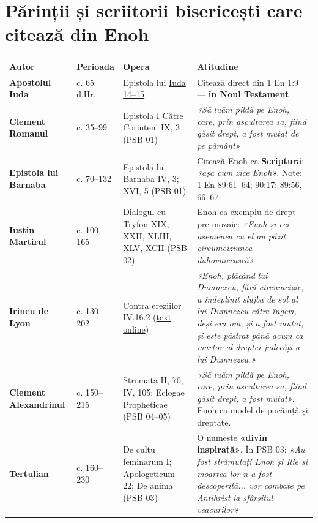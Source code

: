 \documentclass[12pt,a4paper,twoside,openany]{book}
\begin{document}
\chapter{Părinții și scriitorii bisericești care citează din Enoh}\label{parinti}
\small
\begin{longtable}{L{0.8cm}L{0.8cm}L{3.1cm}L{10.0cm}}
\toprule
{}
\textbf{Autor} & \textbf{Perioada} & \textbf{Opera} & \textbf{Atitudine} \\
\midrule
\endhead
{}
\textbf{Apostolul Iuda} & c. 65 d.Hr. & Epistola lui \href{https://bibliaortodoxa.ro/carte.php?id=44\&cap=1\#14}{Iuda 14–15} & Citează direct din 1 En 1:9 — \textbf{în Noul Testament} \\
\textbf{Clement Romanul} & c. 35–99 & Epistola I Către Corinteni IX, 3 (PSB 01) & \textit{«Să luăm pildă pe Enoh, care, prin ascultarea sa, fiind găsit drept, a fost mutat de pe pământ»} \\
\textbf{Epistola lui Barnaba} & c. 70–132 & Epistola lui Barnaba IV, 3; XVI, 5 (PSB 01) & Citează Enoh ca \textbf{Scriptură}: \textit{«așa cum zice Enoh»}. Note: 1 En 89:61–64; 90:17; 89:56, 66–67 \\
\textbf{Iustin Martirul} & c. 100–165 & Dialogul cu Tryfon XIX, XXII, XLIII, XLV, XCII (PSB 02) & Enoh ca exemplu de drept pre-mozaic: \textit{«Enoh și cei asemenea cu el au păzit circumciziunea duhovnicească»} \\
\textbf{Irineu de Lyon} & c. 130–202 & Contra ereziilor IV.16.2 (\href{https://www.newadvent.org/fathers/0103416.htm}{text online}) & \textit{«Enoh, plăcând lui Dumnezeu, fără circumcizie, a îndeplinit slujba de sol al lui Dumnezeu către îngeri, deși era om, și a fost mutat, și este păstrat până acum ca martor al dreptei judecăți a lui Dumnezeu.»} \\
\textbf{Clement Alexandrinul} & c. 150–215 & Stromata II, 70; IV, 105; Eclogae Propheticae (PSB 04–05) & \textit{«Să luăm pildă pe Enoh, care, prin ascultarea sa, fiind găsit drept, a fost mutat»}. Enoh ca model de pocăință și dreptate. \\
\textbf{Tertulian} & c. 160–230 & De cultu feminarum I; Apologeticum 22; De anima (PSB 03) & O numește \textbf{«divin inspirată»}. În PSB 03: \textit{«Au fost strămutați Enoh și Ilie și moartea lor n-a fost descoperită... vor combate pe Antihrist la sfârșitul veacurilor»} \\

\end{longtable}
\end{document}
